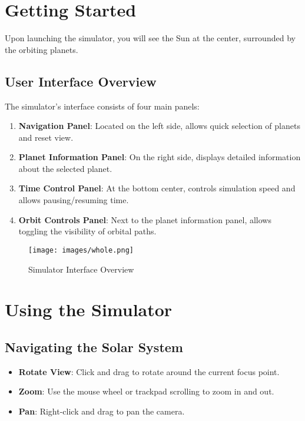 \documentclass[12pt, a4paper]{article}
\begin{document}
\section{Getting Started}

Upon launching the simulator, you will see the Sun at the center, surrounded by
the orbiting planets.

\subsection{User Interface Overview}

The simulator's interface consists of four main panels:

\begin{enumerate}
    \item \textbf{Navigation Panel}: Located on the left side, allows quick selection of planets and reset view.
    \item \textbf{Planet Information Panel}: On the right side, displays detailed information about the selected planet.
    \item \textbf{Time Control Panel}: At the bottom center, controls simulation speed and allows pausing/resuming time.
    \item \textbf{Orbit Controls Panel}: Next to the planet information panel, allows toggling the visibility of orbital paths.
\end{enumerate}

\begin{figure}[H]
    \centering
    \texttt{[image: images/whole.png]}
    \caption{Simulator Interface Overview}
\end{figure}

\section{Using the Simulator}

\subsection{Navigating the Solar System}

\begin{itemize}
    \item \textbf{Rotate View}: Click and drag to rotate around the current focus point.
    \item \textbf{Zoom}: Use the mouse wheel or trackpad scrolling to zoom in and out.
    \item \textbf{Pan}: Right-click and drag to pan the camera.
\end{itemize}
\end{document}
